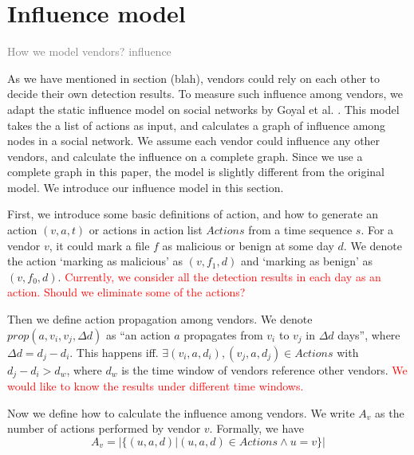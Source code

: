 \section{Influence model}


\textcolor{gray}{How we model vendors? influence}

As we have mentioned in section (blah), vendors could rely on each other to decide their own detection results. 
To measure such influence among vendors, we adapt the static influence model on social networks by Goyal et al. \cite{goyal2010learning}. 
This model takes the a list of actions as input, and calculates a graph of influence among nodes in a social network. 
We assume each vendor could influence any other vendors, and calculate the influence on a complete graph. 
Since we use a complete graph in this paper, the model is slightly different from the original model. 
We introduce our influence model in this section.

First, we introduce some basic definitions of action, and how to generate an action $(v, a , t)$ or actions in action list $Actions$ from a time sequence $s$. 
For a vendor $v$, it could mark a file $f$ as malicious or benign at some day $d$. 
We denote the action `marking as malicious' as $(v, f_1, d)$ and `marking as benign' as $(v, f_0, d)$.  
\textcolor{red}{Currently, we consider all the detection results in each day as an action. Should we eliminate some of the actions?}

Then we define action propagation among vendors. 
We denote $prop(a, v_i, v_j, \Delta d)$ as ``an action $a$ propagates from $v_i$ to $v_j$ in $\Delta d$ days'', where $\Delta d = d_j-d_i$. 
This happens iff. $\exists (v_i, a, d_i), (v_j, a, d_j) \in Actions$ with $d_j-d_i>d_w$, where $d_w$ is the time window of vendors reference other vendors. \textcolor{red}{We would like to know the results under different time windows.} 

Now we define how to calculate the influence among vendors. 
We write $A_v$ as the number of actions performed by vendor $v$. 
Formally, we have 
\begin{equation}
A_v = |\{(u, a, d) | (u, a, d) \in Actions \land u=v\}| 
\end{equation}

